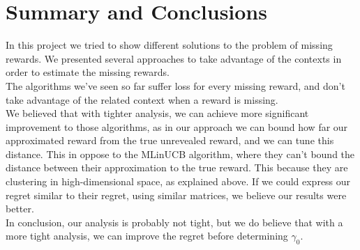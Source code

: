 \documentclass{article}
\begin{document}
\section{Summary and Conclusions}
In this project we tried to show different solutions to the problem of missing rewards. We presented several approaches to take advantage of the contexts in order to estimate the missing rewards.\\
The algorithms we've seen so far suffer loss for every missing reward, and don't take advantage of the related context when a reward is missing.\\

We believed that with tighter analysis, we can achieve more significant improvement to those algorithms, as in our approach we can bound how far our approximated reward from the true unrevealed reward, and we can tune this distance.
This in oppose to the MLinUCB algorithm, where they can't bound the distance between their approximation to the true reward. This because they are clustering in high-dimensional space, as explained above. If we could express our regret similar to their regret, using similar matrices, we believe our results were better. \\

In conclusion, our analysis is probably not tight, but we do believe that with a more tight analysis, we can improve the regret before determining $\gamma_0$.

\newpage
\end{document}
